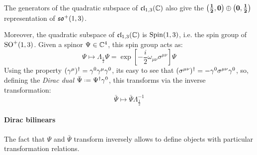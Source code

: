 \begin{proposition}{}{}
  The generators of the quadratic subspace of $ \mathfrak{cl}_{1,3}(\mathbb{C}) $ also give the $ \mathbf{\left( \frac{1}{2},0 \right)} \oplus \mathbf{\left( 0,\frac{1}{2} \right)} $ representation of $ \mathfrak{so}^+(1,3) $.
\end{proposition}

Moreover, the quadratic subspace of $ \mathfrak{cl}_{1,3}(\mathbb{C}) $ is $ \operatorname{Spin}(1,3) $, i.e. the spin group of $ \mathrm{SO}^+(1,3) $. Given a spinor $ \Psi \in \mathbb{C}^4 $, this spin group acts as:
\begin{equation*}
  \Psi \mapsto \Lambda_{\frac{1}{2}} \Psi = \exp \left[ -\frac{i}{2} \omega_{\mu \nu} \sigma^{\mu \nu} \right] \Psi
\end{equation*}
Using the property $ (\gamma^\mu)^\dagger = \gamma^0 \gamma^\mu \gamma^0 $, its easy to see that $ (\sigma^{\mu \nu})^\dagger = - \gamma^0 \sigma^{\mu \nu} \gamma^0 $, so, defining the \textit{Dirac dual} $ \bar{\Psi} \defeq \Psi\dg \gamma^0 $, this transforms via the inverse transformation:
\begin{equation*}
  \bar{\Psi} \mapsto \bar{\Psi} \Lambda_{\frac{1}{2}}^{-1}
\end{equation*}

\paragraph{Dirac bilinears}

The fact that $ \Psi $ and $ \bar{\Psi} $ transform inversely allows to define objects with particular transformation relations.

